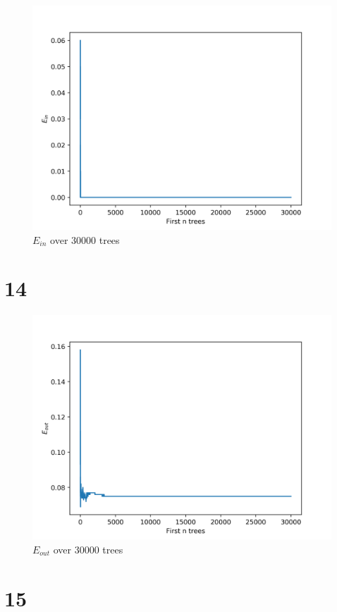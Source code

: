 \documentclass[fleqn,a4paper,12pt]{article}
\begin{document}
\begin{figure}[H]
\centering
\includegraphics[width=0.75\linewidth]{tree-ein.png}
\caption{$E_{in}$ over 30000 trees}
\label{fig:tree-ein}
\end{figure}

\section*{14}

\begin{figure}[H]
\centering
\includegraphics[width=0.75\linewidth]{tree-eout.png}
\caption{$E_{out}$ over 30000 trees}
\label{fig:tree-eout}
\end{figure}

\section*{15}
\end{document}
